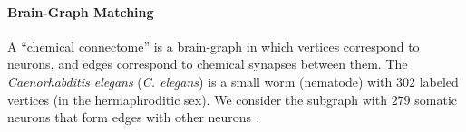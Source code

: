 \documentclass{article} %
\begin{document}



% 


\vspace{-5pt}
\paragraph{Brain-Graph Matching} %
\label{sub:connectome}




A ``chemical connectome'' is a brain-graph in which vertices correspond to neurons, and edges correspond to chemical synapses between them. The \emph{Caenorhabditis elegans} (\emph{C. elegans}) is a small worm (nematode) with $302$ labeled vertices (in the hermaphroditic sex).  We consider the subgraph with $279$ somatic neurons that form edges with other neurons \cite{Varshney2011}.  
\end{document}
